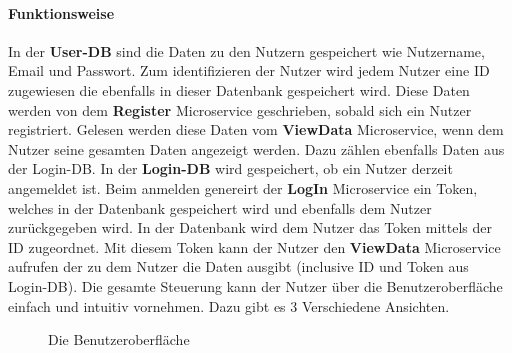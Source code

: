 \paragraph{Funktionsweise}
In der \textbf{User-DB} sind die Daten zu den Nutzern gespeichert wie Nutzername, Email und Passwort. Zum identifizieren der Nutzer wird jedem Nutzer eine ID zugewiesen die ebenfalls in dieser Datenbank gespeichert wird. Diese Daten werden von dem \textbf{Register} Microservice geschrieben, sobald sich ein Nutzer registriert. \newline
Gelesen werden diese Daten vom \textbf{ViewData} Microservice, wenn dem Nutzer seine gesamten Daten angezeigt werden. Dazu zählen ebenfalls Daten aus der Login-DB. \newline
In der \textbf{Login-DB} wird gespeichert, ob ein Nutzer derzeit angemeldet ist. Beim anmelden genereirt der \textbf{LogIn} Microservice ein Token, welches in der Datenbank gespeichert wird und ebenfalls dem Nutzer zurückgegeben wird. In der Datenbank wird dem Nutzer das Token mittels der ID zugeordnet. \newline
Mit diesem Token kann der Nutzer den \textbf{ViewData} Microservice aufrufen der zu dem Nutzer die Daten ausgibt (inclusive ID und Token aus Login-DB). \newline
Die gesamte Steuerung kann der Nutzer über die Benutzeroberfläche einfach und intuitiv vornehmen. Dazu gibt es 3 Verschiedene Ansichten. 
\begin{figure}[bth]
	\hfill
	\caption{Die Benutzeroberfläche}
	\label{fig:UI}
\end{figure}

